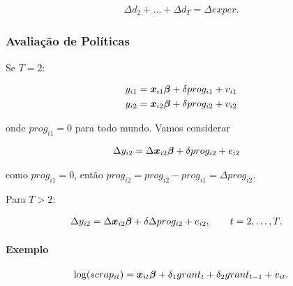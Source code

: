 \documentclass[11pt, oneside, a4paper, article]{article}
\numberwithin{equation}{section}
\begin{document}
\begin{description}
\begin{remark}
\vspace{-1 em}
\begin{align*}
	\Delta d_{2} + \dots + \Delta d_{T} = \Delta exper.
\end{align*}
\end{remark}

\subsubsection{Avaliação de Políticas}

\noindent
Se $T=2$:

\vspace{-1.5 em}
\begin{align*}
y_{i1} &= \boldsymbol{x}_{i1} \boldsymbol{\beta} + \delta prog_{i1} + v_{i1}
\\
y_{i2} &= \boldsymbol{x}_{i2} \boldsymbol{\beta} + \delta prog_{i2} + v_{i2}
\end{align*}

\noindent
onde $prog_{i1} =0$ para todo mundo.
Vamos considerar

\vspace{-1 em}
\begin{align*}
\Delta y_{i2} &= \Delta \boldsymbol{x}_{i2} \boldsymbol{\beta} + \delta prog_{i2} + e_{i2}
\end{align*}

\noindent
como $prog_{i1} =0$, então $prog_{i2} = prog_{i2} - prog_{i1} = \Delta prog_{i2}$.

\vspace{1 em}
\noindent
Para $T>2$:

\vspace{-1.5 em}
\begin{align*}
\Delta y_{i2} &= \Delta\boldsymbol{x}_{i2}\boldsymbol{\beta} + \delta \Delta prog_{i2} + e_{i2},
\qquad t=2, \dots, T.
\end{align*}

\paragraph{Exemplo}
\begin{align*}
	\log(scrap_{it}) =
	\boldsymbol{x}_{it} \boldsymbol{\beta} + \delta_{1} grant_{t} + \delta_{2} grant_{t-1} + v_{it}.
\end{align*}

\clearpage

\end{description}
\end{document}
